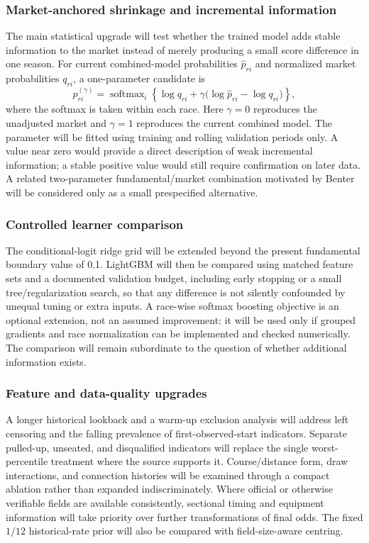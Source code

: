 \subsubsection{Market-anchored shrinkage and incremental information}
The main statistical upgrade will test whether the trained model adds stable information to the market instead of merely producing a small score difference in one season. For current combined-model probabilities $\widehat p_{ri}$ and normalized market probabilities $q_{ri}$, a one-parameter candidate is
\begin{equation}
p_{ri}^{(\gamma)}
=\operatorname{softmax}_{i}\!\left\{\log q_{ri}
+\gamma\bigl(\log\widehat p_{ri}-\log q_{ri}\bigr)\right\},
\label{eq:shrinkage-plan}
\end{equation}
where the softmax is taken within each race. Here $\gamma=0$ reproduces the unadjusted market and $\gamma=1$ reproduces the current combined model. The parameter will be fitted using training and rolling validation periods only. A value near zero would provide a direct description of weak incremental information; a stable positive value would still require confirmation on later data. A related two-parameter fundamental/market combination motivated by Benter will be considered only as a small prespecified alternative\cite{benter1994}.

\subsubsection{Controlled learner comparison}
The conditional-logit ridge grid will be extended beyond the present fundamental boundary value of 0.1. LightGBM will then be compared using matched feature sets and a documented validation budget, including early stopping or a small tree/regularization search, so that any difference is not silently confounded by unequal tuning or extra inputs. A race-wise softmax boosting objective is an optional extension, not an assumed improvement: it will be used only if grouped gradients and race normalization can be implemented and checked numerically. The comparison will remain subordinate to the question of whether additional information exists.

\subsubsection{Feature and data-quality upgrades}
A longer historical lookback and a warm-up exclusion analysis will address left censoring and the falling prevalence of first-observed-start indicators. Separate pulled-up, unseated, and disqualified indicators will replace the single worst-percentile treatment where the source supports it. Course/distance form, draw interactions, and connection histories will be examined through a compact ablation rather than expanded indiscriminately. Where official or otherwise verifiable fields are available consistently, sectional timing and equipment information will take priority over further transformations of final odds. The fixed $1/12$ historical-rate prior will also be compared with field-size-aware centring.

